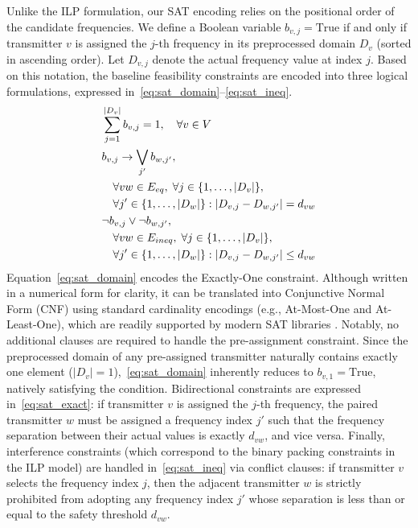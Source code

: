 \documentclass[letterpaper,journal]{IEEEtran}
\begin{document}
Unlike the ILP formulation, our SAT encoding relies on the positional order of the candidate frequencies. We define a Boolean variable $b_{v,j} = \text{True}$ if and only if transmitter $v$ is assigned the $j$-th frequency in its preprocessed domain $D_v$ (sorted in ascending order). Let $D_{v,j}$ denote the actual frequency value at index $j$. Based on this notation, the baseline feasibility constraints are encoded into three logical formulations, expressed in~\eqref{eq:sat_domain}--\eqref{eq:sat_ineq}.
 \begin{align}
    & \sum_{j=1}^{|D_v|} b_{v,j} = 1, \quad \forall v \in V \label{eq:sat_domain} \\
    & b_{v,j} \rightarrow \bigvee_{j'} b_{w,j'}, \notag \\
    & \quad \forall vw \in E_{eq}, \; \forall j \in \{1, \dots, |D_v|\}, \notag \\
    & \quad \forall j' \in \{1, \dots, |D_w|\} : |D_{v,j} - D_{w,j'}| = d_{vw} \label{eq:sat_exact} \\
    & \neg b_{v,j} \vee \neg b_{w,j'}, \notag \\
    & \quad \forall vw \in E_{ineq}, \; \forall j \in \{1, \dots, |D_v|\}, \notag \\
    & \quad \forall j' \in \{1, \dots, |D_w|\} : |D_{v,j} - D_{w,j'}| \le d_{vw} \label{eq:sat_ineq}
\end{align}
Equation~\eqref{eq:sat_domain} encodes the Exactly-One constraint. Although written in a numerical form for clarity, it can be translated into Conjunctive Normal Form (CNF) using standard cardinality encodings (e.g., At-Most-One and At-Least-One), which are readily supported by modern SAT libraries \cite{imms-sat18, itk-sat24}.
Notably, no additional clauses are required to handle the pre-assignment constraint. Since the preprocessed domain of any pre-assigned transmitter naturally contains exactly one element ($|D_v| = 1$),~\eqref{eq:sat_domain} inherently reduces to $b_{v,1} = \text{True}$, natively satisfying the condition. 
Bidirectional constraints are expressed in~\eqref{eq:sat_exact}: if transmitter $v$ is assigned the $j$-th frequency, the paired transmitter $w$ must be assigned a frequency index $j'$ such that the frequency separation between their actual values is exactly $d_{vw}$, and vice versa. 
Finally, interference constraints (which correspond to the binary packing constraints in the ILP model) are handled in~\eqref{eq:sat_ineq} via conflict clauses: if transmitter $v$ selects the frequency index $j$, then the adjacent transmitter $w$ is strictly prohibited from adopting any frequency index $j'$ whose separation is less than or equal to the safety threshold $d_{vw}$.
\end{document}
